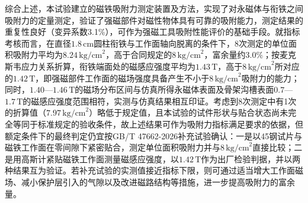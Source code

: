 综合上述，本试验建立的磁铁吸附力测定装置及方法，实现了对永磁体与衔铁之间吸附力的定量测定，验证了强磁部件对磁性物体具有可靠的吸附能力，测定结果的重复性良好（变异系数3.1\%），可作为强磁工具吸附性能评价的基础手段。就指标考核而言，在直径$1.8\,\text{cm}$圆柱衔铁与工作面轴向脱离的条件下，8次测定的单位面积吸附力平均为$8.24\,\text{kg/cm}^2$，高于合同规定的$8\,\text{kg/cm}^2$，富余量约$3.0\%$；按麦克斯韦应力关系折算，衔铁端面处的磁感应强度平均为$1.43\,\text{T}$，高于$8\,\text{kg/cm}^2$所对应的$1.42\,\text{T}$，即强磁部件工作面的磁场强度具备产生不小于$8\,\text{kg/cm}^2$吸附力的能力；同时，$1.40$—$1.46\,\text{T}$的磁场分布区间与仿真所得永磁体表面及骨架沟槽表面$0.7$—$1.7\,\text{T}$的磁感应强度范围相符，实测与仿真结果相互印证。考虑到8次测定中有1次的折算值（$7.97\,\text{kg/cm}^2$）略低于规定值，且本试验的试件形状与贴合状态尚未完全等同于标准规定的验收条件，故上述结果可作为吸附力指标满足要求的依据，但额定条件下的最终判定仍宜按GB/T 47662-2026补充试验确认：一是以45钢试片与磁铁工作面在零间隙下紧密贴合，测定单位面积吸附力并与$8\,\text{kg/cm}^2$直接比较；二是用高斯计紧贴磁铁工作面测量磁感应强度，以$1.42\,\text{T}$作为出厂检验判据，并以两种结果互为验证。若补充试验的实测值接近指标下限，则可通过适当增大工作面磁场、减小保护层引入的气隙以及改进磁路结构等措施，进一步提高吸附力的富余量。
